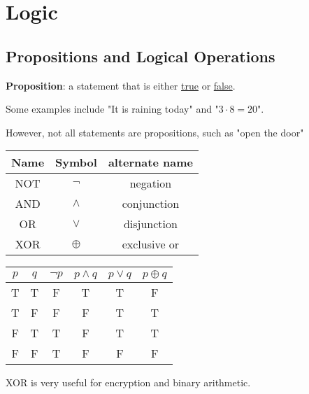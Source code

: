 \section{Logic}
\subsection{Propositions and Logical Operations}

\textbf{Proposition}: a statement that is either \underline{true} or \underline{false}.


Some examples include "It is raining today" and "$3 \cdot 8 = 20 $".


However, not all statements are propositions, such as "open the door"

\begin{center}
  \begin{tabular}{c|c|c}
    \textbf{Name} & \textbf{Symbol} & \textbf{alternate name} \\
    \hline
    NOT           & $\lnot$         & negation                \\
    AND           & $\land$         & conjunction             \\
    OR            & $\lor$          & disjunction             \\
    XOR           & $\oplus$        & exclusive or            \\
  \end{tabular}
  \qquad
  \begin{tabular}{c|c|c|c|c|c}
    \textbf{$p$} & \textbf{$q$} & \textbf{$\lnot p$} & \textbf{$p \land q$} & \textbf{$p \lor q$} & \textbf{$p \oplus q$} \\
    \hline
    T            & T            & F                  & T                    & T                   & F                     \\
    T            & F            & F                  & F                    & T                   & T                     \\
    F            & T            & T                  & F                    & T                   & T                     \\
    F            & F            & T                  & F                    & F                   & F                     \\
  \end{tabular}
\end{center}

XOR is very useful for encryption and binary arithmetic.

